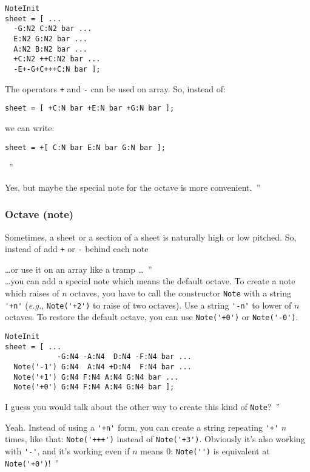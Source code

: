 \documentclass{article}
\newcommand{\note}{\lstinline!Note!\xspace}
\newcommand{\eg}{\emph{e.g.}\xspace}
\newenvironment{meenv}{ \par \noindent \makebox[6em][r]{ \textcolor{mecolor}{Me}: `` --~}}{~''}
\newenvironment{myselfenv}{ \par \noindent \makebox[6em][r]{ \textcolor{myselfcolor}{Myself}: `` --~}}{~''}
\newcommand{\me}[1]{\begin{meenv}#1\end{meenv}}
\newcommand{\myself}[1]{\begin{myselfenv}#1\end{myselfenv}}
\begin{document}
\begin{lstlisting}
NoteInit
sheet = [ ...
  -G:N2 C:N2 bar ...
  E:N2 G:N2 bar ...
  A:N2 B:N2 bar ...
  +C:N2 ++C:N2 bar ...
  -E+-G+C+++C:N bar ];
\end{lstlisting}

\begin{meenv}%
The operators \lstinline!+! and \lstinline!-! can be used on array. So, instead of:
\begin{lstlisting}
sheet = [ +C:N bar +E:N bar +G:N bar ];
\end{lstlisting}
we can write:
\begin{lstlisting}
sheet = +[ C:N bar E:N bar G:N bar ];
\end{lstlisting}%
\end{meenv}
\myself{Yes, but maybe the special note for the octave is more convenient.}

\subsubsection{Octave (note)}
\label{sec:OctaveNote}

Sometimes, a sheet or a section of a sheet is naturally high or low pitched. So, instead of add \lstinline!+! or \lstinline!-! behind each note
\myself{\dots or use it on an array like a tramp \dots} \\
\dots you can add a special note which means the default octave. To create a note which raises of $n$ octaves, you have to call the constructor \note with a string \lstinline!'+n'! (\eg, \lstinline!Note('+2')! to raise of two octaves). Use a string \lstinline!'-n'! to lower of $n$ octaves. To restore the default octave, you can use \lstinline!Note('+0')! or \lstinline!Note('-0')!. \\

\begin{lstlisting}
NoteInit
sheet = [ ...
            -G:N4 -A:N4  D:N4 -F:N4 bar ...
  Note('-1') G:N4  A:N4 +D:N4  F:N4 bar ...
  Note('+1') G:N4 F:N4 A:N4 G:N4 bar ...
  Note('+0') G:N4 F:N4 A:N4 G:N4 bar ];
\end{lstlisting}

\myself{I guess you would talk about the other way to create this kind of \note?}
\me{Yeah. Instead of using a \lstinline!'+n'! form, you can create a string repeating \lstinline!'+'! $n$ times, like that: \lstinline!Note('+++')! instead of \lstinline!Note('+3')!. Obviously it's also working with \lstinline!'-'!, and it's working even if $n$ means $0$: \lstinline!Note('')! is equivalent at \lstinline!Note('+0')!!}
\end{document}
